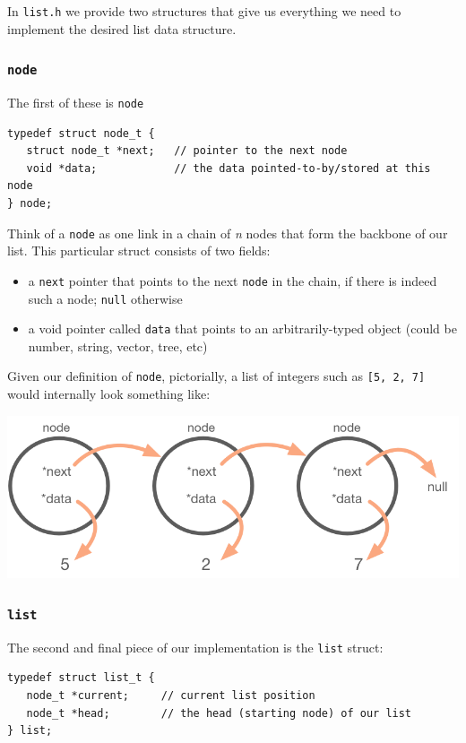 \documentclass[12pt]{article}
\begin{document}
In \texttt{list.h} we provide two structures that give us everything we need to implement the desired list data structure. 

\subsubsection{\large{\texttt{node}}}

The first of these is \texttt{node}
\begin{mdframed}[backgroundcolor=light-gray, innerleftmargin=10, innertopmargin=1,innerbottommargin=1,linecolor=light-gray]
\begin{lstlisting}
typedef struct node_t {
   struct node_t *next;   // pointer to the next node
   void *data;         	  // the data pointed-to-by/stored at this node
} node;
\end{lstlisting}
\end{mdframed}

\noindent Think of a \texttt{node} as one link in a chain of \textit{n} nodes that form the backbone of our list. This particular struct consists of two fields:
\begin{itemize}
\item a \texttt{next} pointer that points to the next \texttt{node} in the chain, if there is indeed such a node; \texttt{null} otherwise
\item a void pointer called \texttt{data} that points to an arbitrarily-typed object (could be number, string, vector, tree, etc)
\end{itemize}

\noindent Given our definition of \texttt{node}, pictorially, a list of integers such as \texttt{[5, 2, 7]} would internally look something like:

\begin{center}
\includegraphics[scale=0.60]{figures/node_diag1.png}
\end{center}

\subsubsection{\large{\texttt{list}}}
The second and final piece of our implementation is the \texttt{list} struct:
\begin{mdframed}[backgroundcolor=light-gray, innerleftmargin=10, innertopmargin=1,innerbottommargin=1,linecolor=light-gray]
\begin{lstlisting}
typedef struct list_t {
   node_t *current;     // current list position 
   node_t *head;        // the head (starting node) of our list
} list;
\end{lstlisting}
\end{mdframed}
\end{document}

